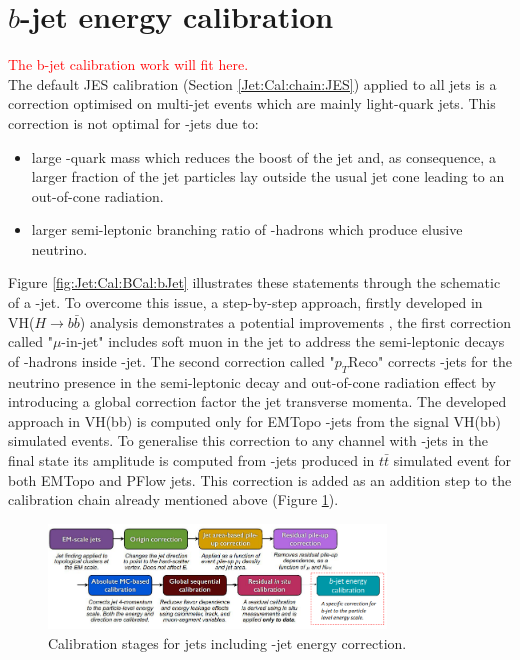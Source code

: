 \section{$b$-jet energy calibration}
\label{Jet:Cal:BCal}
\textcolor{red}{The b-jet calibration work will fit here. \\}
The default JES calibration (Section \ref{Jet:Cal:chain:JES}) applied to all jets is a correction optimised on multi-jet events which are mainly light-quark jets. This correction is not optimal for \bq-jets due to:
\begin{itemize}
    \item large \bq-quark mass which reduces the boost of the jet and, as consequence, a larger fraction of the jet particles lay outside the usual jet cone leading to an out-of-cone radiation.
    \item larger semi-leptonic branching ratio of \bq-hadrons which produce elusive neutrino.
\end{itemize}
Figure \ref{fig:Jet:Cal:BCal:bJet} illustrates these statements through the schematic of a \bq-jet. To overcome this issue, a step-by-step approach, firstly developed in VH($H\rightarrow b\bar{b}$) analysis demonstrates a potential improvements \cite{Vhbb}, the first correction called "$\mu$-in-jet" includes soft muon in the jet to address the semi-leptonic decays of \bq-hadrons inside \bq-jet. The second correction called "$p_T$Reco" corrects \bq-jets for the neutrino presence in the semi-leptonic decay and out-of-cone radiation effect by introducing a global correction factor the jet transverse momenta. The developed approach in VH(bb) is computed only for EMTopo \bq-jets from the signal VH(bb) simulated events. To generalise this correction to any channel with \bq-jets in the final state its amplitude is computed from \bq-jets produced in $t\bar{t}$ simulated event for both EMTopo and PFlow jets. This correction is added as an addition step to the calibration chain already mentioned above (Figure \ref{fig:Jet:Cal:BCal:Chain}).
\begin{figure}[htbp]
    \centering
    \includegraphics[width=0.8\textwidth]{Ch4/Img/b_jet_chain.png}
    \caption{Calibration stages for jets including \bq-jet energy correction.}
    \label{fig:Jet:Cal:BCal:Chain}
\end{figure}
